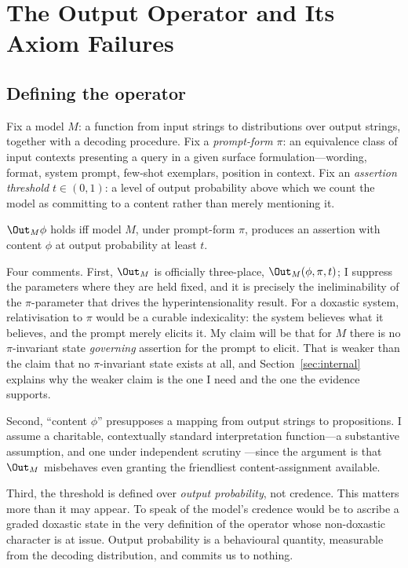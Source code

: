 \section{The Output Operator and Its Axiom Failures}
\label{sec:output-operator}

\subsection{Defining the operator}
\label{sec:defining-o}

Fix a model $M$: a function from input strings to distributions over output
strings, together with a decoding procedure. Fix a \emph{prompt-form} $\pi$: an
equivalence class of input contexts presenting a query in a given surface
formulation---wording, format, system prompt, few-shot exemplars, position in
context. Fix an \emph{assertion threshold} $t \in (0,1)$: a level of output
probability above which we count the model as committing to a content rather
than merely mentioning it.

\begin{definition}
\label{def:output}
$\Out_M \phi$ holds iff model $M$, under prompt-form $\pi$, produces an
assertion with content $\phi$ at output probability at least $t$.
\end{definition}

Four comments. First, $\Out_M$ is officially three-place, $\Out_M(\phi, \pi, t)$;
I suppress the parameters where they are held fixed, and it is precisely the
ineliminability of the $\pi$-parameter that drives the hyperintensionality
result. For a doxastic system, relativisation to $\pi$ would be a curable
indexicality: the system believes what it believes, and the prompt merely
elicits it. My claim will be that for $M$ there is no $\pi$-invariant state
\emph{governing} assertion for the prompt to elicit. That is weaker than the
claim that no $\pi$-invariant state exists at all, and
Section~\ref{sec:internal} explains why the weaker claim is the one I need and
the one the evidence supports.

Second, ``content $\phi$'' presupposes a mapping from output strings to
propositions. I assume a charitable, contextually standard interpretation
function---a substantive assumption, and one under independent scrutiny
\citep{mandelkern2024}---since the argument is that $\Out_M$ misbehaves even granting the
friendliest content-assignment available.

Third, the threshold is defined over \emph{output probability}, not credence.
This matters more than it may appear. To speak of the model's credence would be
to ascribe a graded doxastic state in the very definition of the operator whose
non-doxastic character is at issue. Output probability is a behavioural quantity,
measurable from the decoding distribution, and commits us to nothing.

